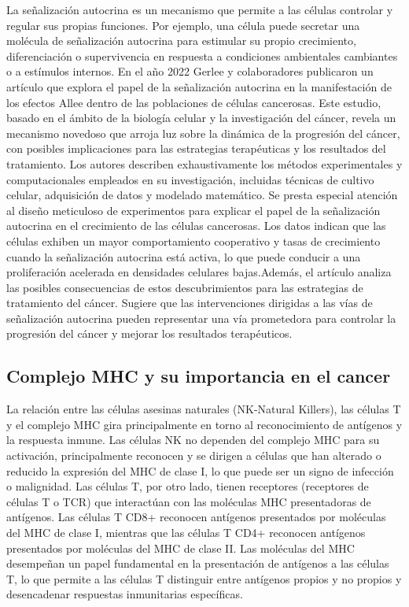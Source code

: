 \documentclass{article}
\begin{document}
La señalización autocrina es un mecanismo que permite a las células controlar y regular sus propias funciones. Por ejemplo, una célula puede secretar una molécula de señalización autocrina para estimular su propio crecimiento, diferenciación o supervivencia en respuesta a condiciones ambientales cambiantes o a estímulos internos. En el año 2022 Gerlee y colaboradores 
publicaron un artículo \cite{Gerlee032022} que  explora el papel de la señalización autocrina en la manifestación de los efectos Allee dentro de las poblaciones de células cancerosas. Este estudio, basado en el ámbito de la biología celular y la investigación del cáncer, revela un mecanismo novedoso que arroja luz sobre la dinámica de la progresión del cáncer, con posibles implicaciones para las estrategias terapéuticas y los resultados del tratamiento. Los autores describen exhaustivamente los métodos experimentales y computacionales empleados en su investigación, incluidas técnicas de cultivo celular, adquisición de datos y modelado matemático. Se presta especial atención al diseño meticuloso de experimentos para explicar el papel de la señalización autocrina en el crecimiento de las células cancerosas. Los datos indican que las células exhiben un mayor comportamiento cooperativo y tasas de crecimiento cuando la señalización autocrina está activa, lo que puede conducir a una proliferación acelerada en densidades celulares bajas.Además, el artículo analiza las posibles consecuencias de estos descubrimientos para las estrategias de tratamiento del cáncer. Sugiere que las intervenciones dirigidas a las vías de señalización autocrina pueden representar una vía prometedora para controlar la progresión del cáncer y mejorar los resultados terapéuticos.




\subsection{Complejo MHC y su importancia en el cancer}
La relación entre las células asesinas naturales (NK-Natural Killers), las células T y el complejo MHC gira principalmente en torno al reconocimiento de antígenos y la respuesta inmune. Las células NK no dependen del complejo MHC para su activación, principalmente reconocen y se dirigen a células que han alterado o reducido la expresión del MHC de clase I, lo que puede ser un signo de infección o malignidad. Las células T, por otro lado, tienen receptores (receptores de células T o TCR) que interactúan con las moléculas MHC presentadoras de antígenos. Las células T CD8+ reconocen antígenos presentados por moléculas del MHC de clase I, mientras que las células T CD4+ reconocen antígenos presentados por moléculas del MHC de clase II. Las moléculas del MHC desempeñan un papel fundamental en la presentación de antígenos a las células T, lo que permite a las células T distinguir entre antígenos propios y no propios y desencadenar respuestas inmunitarias específicas.
\end{document}

